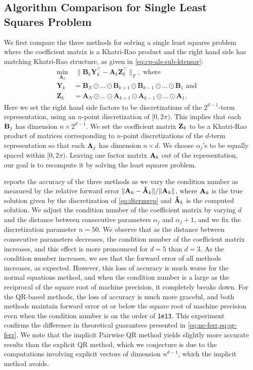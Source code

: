 \documentclass{article}
\newcommand{\mat}[1]{\mathbf{#1}}
\newcommand{\M}[2][]{\bm{#1{\mathbf{\MakeUppercase{#2}}}}} 		%
\begin{document}
\subsection{Algorithm Comparison for Single Least Squares Problem}

We first compare the three methods for solving a single least squares problem where the coefficient matrix is a Khatri-Rao product and the right hand side has matching Khatri-Rao structure, as given in \cref{eq:cp-als-sub-ktensor}:
\begin{align*}
\min_{\mat{A}_k} & \; \|\mat{B}_{k}\mat{Y}_k^\top-\mat{A}_k\mat{Z}_k^\top\|_F, \text{ where} \\
\mat{Y}_k &= \mat{B}_N \odot \dots \odot \mat{B}_{k+1} \odot \mat{B}_{k-1} \odot \dots \odot \mat{B}_1 \text{ and} \\
\mat{Z}_k &= \mat{A}_N \odot \dots \odot \mat{A}_{k+1} \odot \mat{A}_{k-1} \odot \dots \odot \mat{A}_1.
\end{align*}
Here we set the right hand side factors to be discretizations of the $2^{d-1}$-term representation, using an $n$-point discretization of $[0,2\pi)$.
This implies that each $\M{B}_j$ has dimension $n \times 2^{d-1}$.
We set the coefficient matrix $\M{Z}_k$ to be a Khatri-Rao product of matrices corresponding to $n$-point discretizations of the $d$-term representation so that each $\M{A}_j$ has dimension $n\times d$. 
We choose $\alpha_j$'s to be equally spaced within $[0,2\pi)$.
Leaving one factor matrix $\M{A}_k$ out of the representation, our goal is to recompute it by solving the least squares problem.

 reports the accuracy of the three methods as we vary the condition number as measured by the relative forward error $\|\M{A}_k-\M[\hat]{A}_k\|/\|\M{A}_k\|$, where $\M{A}_k$ is the true solution given by the discretization of \cref{eq:dtermrep} and $\M[\hat]{A}_k$ is the computed solution.
We adjust the condition number of the coefficient matrix by varying $d$ and the distance between consecutive parameters $\alpha_j$ and $\alpha_j+1$, and we fix the discretization parameter $n=50$.
We observe that as the distance between consecutive parameters decreases, the condition number of the coefficient matrix increases, and this effect is more pronounced for $d=5$ than $d=3$.
As the condition number increases, we see that the forward error of all methods increases, as expected.
However, this loss of accuracy is much worse for the normal equations method, and when the condition number is a large as the reciprocal of the square root of machine precision, it completely breaks down.
For the QR-based methods, the loss of accuracy is much more graceful, and both methods maintain forward error at or below the square root of machine precision even when the condition number is on the order of \texttt{1e13}.
This experiment confirms the difference in theoretical guarantees presented in \cref{eq:ne-ferr,eq:qr-ferr}.
We note that the implicit Pairwise QR method yields slightly more accurate results than the explicit QR method, which we conjecture is due to the computations involving explicit vectors of dimension $n^{d-1}$, which the implicit method avoids.
\end{document}
